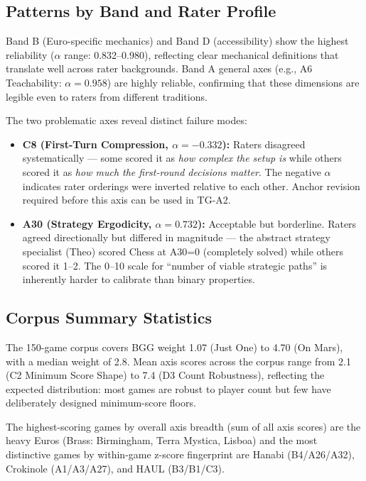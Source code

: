 \subsection{Patterns by Band and Rater Profile}

Band B (Euro-specific mechanics) and Band D (accessibility) show the highest reliability
($\alpha$ range: 0.832--0.980), reflecting clear mechanical definitions that translate
well across rater backgrounds. Band A general axes (e.g., A6 Teachability: $\alpha = 0.958$)
are highly reliable, confirming that these dimensions are legible even to raters from
different traditions.

The two problematic axes reveal distinct failure modes:
\begin{itemize}
  \item \textbf{C8 (First-Turn Compression, $\alpha = -0.332$):} Raters disagreed
  systematically — some scored it as \emph{how complex the setup is} while others scored it
  as \emph{how much the first-round decisions matter}. The negative $\alpha$ indicates
  rater orderings were inverted relative to each other. Anchor revision required before
  this axis can be used in TG-A2.

  \item \textbf{A30 (Strategy Ergodicity, $\alpha = 0.732$):} Acceptable but borderline.
  Raters agreed directionally but differed in magnitude — the abstract strategy specialist
  (Theo) scored Chess at A30=0 (completely solved) while others scored it 1--2.
  The 0--10 scale for ``number of viable strategic paths'' is inherently harder to calibrate
  than binary properties.
\end{itemize}

\subsection{Corpus Summary Statistics}

The 150-game corpus covers BGG weight 1.07 (Just One) to 4.70 (On Mars),
with a median weight of 2.8. Mean axis scores across the corpus range from
2.1 (C2 Minimum Score Shape) to 7.4 (D3 Count Robustness), reflecting the
expected distribution: most games are robust to player count but few have
deliberately designed minimum-score floors.

The highest-scoring games by overall axis breadth (sum of all axis scores)
are the heavy Euros (Brass: Birmingham, Terra Mystica, Lisboa) and the most
distinctive games by within-game z-score fingerprint are Hanabi (B4/A26/A32),
Crokinole (A1/A3/A27), and HAUL (B3/B1/C3).
